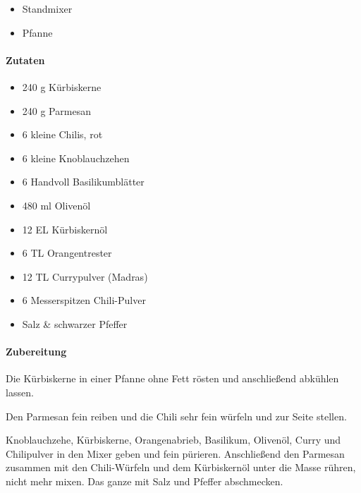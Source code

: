 \begin{itemize}[noitemsep]
	\item Standmixer
	\item Pfanne
\end{itemize}

\paragraph{Zutaten}

\begin{itemize}[noitemsep]
	\item 240 g Kürbiskerne
	\item 240 g Parmesan
	\item 6 kleine Chilis, rot
	\item 6 kleine Knoblauchzehen
	\item 6 Handvoll Basilikumblätter
	\item 480 ml Olivenöl
	\item 12 EL Kürbiskernöl
	\item 6 TL Orangentrester
	\item 12 TL Currypulver (Madras)
	\item 6 Messerspitzen Chili-Pulver
	\item Salz \& schwarzer Pfeffer
\end{itemize}

\paragraph{Zubereitung}

Die Kürbiskerne in einer Pfanne ohne Fett rösten und anschließend abkühlen lassen.

Den Parmesan fein reiben und die Chili sehr fein würfeln und zur Seite stellen.

Knoblauchzehe, Kürbiskerne, Orangenabrieb, Basilikum, Olivenöl, Curry und Chilipulver in den Mixer geben und fein pürieren. Anschließend den Parmesan zusammen mit den Chili-Würfeln und dem Kürbiskernöl unter die Masse rühren, nicht mehr mixen. Das ganze mit Salz und Pfeffer abschmecken.